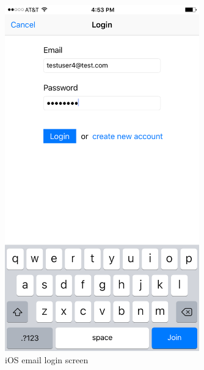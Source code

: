 	\begin{figure}[tbh]
	\begin{center}
	\includegraphics[width=0.75\textwidth]{iOSPictures/img_3896.png}
	\end{center}
	\caption{iOS email login screen \label{iOSemailLoginScreen}}
	\end{figure}

